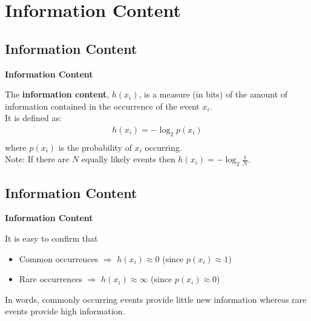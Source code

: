 \documentclass[compress]{beamer}        %
\makeatletter
\newcommand{\tcb}{\textcolor{beamer@blendedblue}}
\makeatother
\begin{document}
\section{Information Content}
\subsection{Information Content}
\begin{frame}{\bf \tcb{Information Content}}

The {\bf information content}, $h(x_i)$, is a measure (in bits) of the amount of information contained in the occurrence of the event $x_i$.\\[0.6cm]
It is defined as:
\begin{align*}
\boxed{h(x_i) = - \log_2 p(x_i)}\\
\end{align*}
where $p(x_i)$ is the probability of $x_i$ occurring.\\[0.6cm]

Note: If there are $N$ equally likely events then $h(x_i) = - \log_2 \frac{1}{N}$.

\end{frame}



\subsection{Information Content}
\begin{frame}{\bf \tcb{Information Content}}

It is easy to confirm that\\[0.5cm]
\begin{itemize}\itemsep0.8cm
\item Common occurrences \quad $\Rightarrow$  \quad $h(x_i) \approx 0$ \qquad (since $p(x_i) \approx 1$)
\item Rare occurrences  \quad  $\Rightarrow$ \quad  $h(x_i) \approx \infty$ \qquad (since $p(x_i) \approx 0$) \\[1cm]
\end{itemize}

In words, commonly occurring events provide little new information whereas rare events provide high information.


\end{frame}
\end{document}
